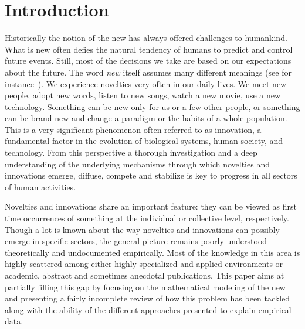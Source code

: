 \documentclass[graybox]{svmult}
\begin{document}
\section{Introduction}
\label{intro}
Historically the notion of the new has always offered challenges to humankind. What is new often defies the natural tendency of humans to predict and control future events. Still, most of the decisions we take are based on our expectations about the future. The word {\it new} itself assumes many different meanings (see for instance~\cite{North_2013}). We experience novelties very often in our daily lives.  We meet new people, adopt new words, listen to new songs, watch a new movie, use a new technology. Something can be new only for us or a few other people, or something can be brand new and change a paradigm or the habits of a whole population. This is a very significant phenomenon often referred to as innovation, a fundamental factor in the evolution of biological systems, human society, and technology. From this perspective a thorough investigation and a deep understanding of the underlying mechanisms through which novelties and innovations emerge, diffuse, compete and stabilize is key to progress in all 
sectors of human activities. 

Novelties and innovations share an important feature: they can be viewed as first time occurrences of something at the individual or collective level, respectively. Though a lot is known about the way novelties and innovations can possibly emerge in specific sectors, the general picture remains poorly understood theoretically and undocumented empirically. Most of the knowledge in this area is highly scattered among either highly specialized and applied environments or academic, abstract and sometimes anecdotal publications. This paper aims at partially filling this gap by focusing on the mathematical modeling of the new and presenting a fairly incomplete review of how this problem has been tackled along with the ability of the different approaches presented to explain empirical data.
\end{document}
